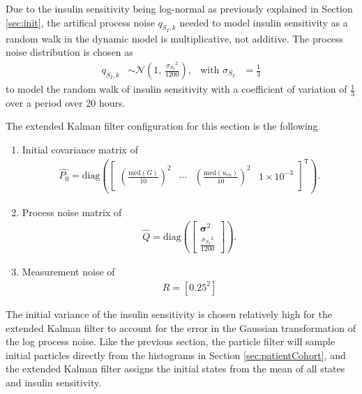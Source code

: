 \documentclass[nomenclature, english, bibtex]{kththesis}
\begin{document}
Due to the insulin sensitivity being log-normal as previously explained in Section \ref{sec:init}, the artifical process noise $q_{S_{I},k}$ needed to model insulin sensitivity as a random walk in the dynamic model is multiplicative, not additive. The process noise distribution is chosen as
\begin{equation}
    \begin{aligned}
        q_{S_I,k} &\sim \mathcal{N}\left(1, \,\frac{{\sigma_{S_I}}^2}{1200} \right), &
        \text{with } \sigma_{S_I} &= \frac{1}{3}
    \end{aligned}
\end{equation}
to model the random walk of insulin sensitivity with a coefficient of variation of $\frac{1}{3}$ over a period over 20 hours.

The extended Kalman filter configuration for this section is the following
\begin{enumerate}
    \item Initial covariance matrix of 
        \begin{align}
            \hat{P_0}= \mathrm{diag}\left( \begin{bmatrix}
            \left(\frac{\mathrm{med}(G)}{10}\right)^2 &
            \cdots &
            \left(\frac{\mathrm{med}(u_{en})}{10}\right)^2 &
            1 \times 10^{-3}
            \end{bmatrix}^{\mathsf{T}}
            \right).
        \end{align}
    \item Process noise matrix of     
        \begin{align} \label{eq:processVary}
            \hat{Q}=\mathrm{diag}\left(
            \begin{bmatrix}
                \bm{\sigma}^2 \\
                \frac{{\sigma_{S_I}}^2}{1200} 
            \end{bmatrix}\right).
        \end{align}        

    \item Measurement noise of 
        \begin{align}
            R = \left[0.25^2\right]
        \end{align}
\end{enumerate}
The initial variance of the insulin sensitivity is chosen relatively high for the extended Kalman filter to account for the error in the Gaussian transformation of the log process noise. Like the previous section, the particle filter will sample initial particles directly from the histograms in Section \ref{sec:patientCohort}, and the extended Kalman filter assigns the initial states from the mean of all states and insulin sensitivity.
\end{document}
